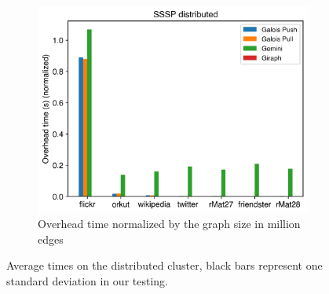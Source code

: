 \begin{figure}[t!]
\begin{subfigure}{0.3\textwidth}
		\includegraphics[width=\linewidth]{../../plots/distributedSSSP_overheadTimeNormalized.png}
		\caption{Overhead time normalized by the graph size in million edges}
		\label{fig:distributedSSSP_overheadNormalized}
	\end{subfigure}
	\caption{Average times on the distributed cluster, black bars represent one standard deviation in our testing.}
	\label{fig:distributedSSSP}
\end{figure}




